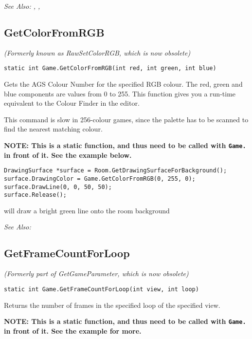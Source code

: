 \it{See Also:} ,
,


\subsection{GetColorFromRGB}\label{Game.GetColorFromRGB}%

\it{(Formerly known as RawSetColorRGB, which is now obsolete)}

\begin{verbatim}
static int Game.GetColorFromRGB(int red, int green, int blue)
\end{verbatim}
Gets the AGS Colour Number for the specified RGB colour. The red, green and blue
components are values from 0 to 255. This function gives you a run-time equivalent
to the Colour Finder in the editor.

This command is slow in 256-colour games, since the palette has to be scanned to find the
nearest matching colour.

\bf{NOTE:} This is a static function, and thus need to be called with \verb$Game.$ in front of it. See
the example below.

\begin{verbatim}
DrawingSurface *surface = Room.GetDrawingSurfaceForBackground();
surface.DrawingColor = Game.GetColorFromRGB(0, 255, 0);
surface.DrawLine(0, 0, 50, 50);
surface.Release();
\end{verbatim}
will draw a bright green line onto the room background

\it{See Also:} 


\subsection{GetFrameCountForLoop}\label{Game.GetFrameCountForLoop}%

\it{(Formerly part of GetGameParameter, which is now obsolete)}

\begin{verbatim}
static int Game.GetFrameCountForLoop(int view, int loop)
\end{verbatim}
Returns the number of frames in the specified loop of the specified view.

\bf{NOTE:} This is a static function, and thus need to be called with \verb$Game.$ in front of it. See
the example for more.

